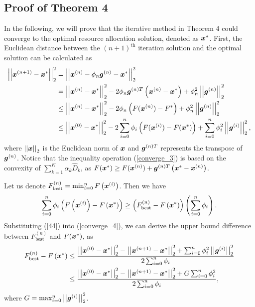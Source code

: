 \documentclass[journal,draftcls,onecolumn,12pt,twoside]{IEEEtran}
\newcommand{\bm}[1]{\mbox{\boldmath{$#1$}}}
\begin{document}
\begin{appendices}
\section{Proof of Theorem 4}
In the following, we will prove that the iterative method in Theorem 4 could converge to the optimal resource allocation solution, denoted as ${\bm{x}}^*$. First, the Euclidean distance between the $(n+1)^{\text{th}}$ iteration solution and the optimal solution can be calculated as
\begin{align}
    \left|\left|{\bm{x}}^{(n+1)}-{\bm{x}}^*\right|\right|_2^2
        &= \left|\left|{\bm{x}}^{(n)}-\phi_n{\bm{g}}^{(n)}-{\bm{x}}^*\right|\right|_2^2  \label{converge_1}\\
        &= \left|\left|{\bm{x}}^{(n)}-{\bm{x}}^*\right|\right|_2^2-2\phi_n{\bm{g}}^{(n)T}\left({\bm{x}}^{(n)}-{\bm{x}}^*\right)+\phi_n^2\left|\left|{\bm{g}}^{(n)}\right|\right|_2^2  \label{converge_2}\\
        &\le\left|\left|{\bm{x}}^{(n)}-{\bm{x}}^*\right|\right|_2^2-2\phi_n\left(F({\bm{x}}^{(n)})-F^*\right)+\phi_n^2\left|\left|{\bm{g}}^{(n)}\right|\right|_2^2 \label{converge_3}\\
        &\le\left|\left|{\bm{x}}^{(0)}-{\bm{x}}^*\right|\right|_2^2-2\sum_{i=0}^{n}\phi_i\left(F({\bm{x}}^{(i)})-F({\bm{x}}^*)\right)+\sum_{i=0}^{n}\phi_i^2\left|\left|{\bm{g}}^{(i)}\right|\right|_2^2, \label{converge_4}
\end{align}
where $\left|\left|{\bm{x}}\right|\right|_2$ is the Euclidean norm of ${\bm{x}}$ and $\bm{g}^{(n)T}$ represents the transpose of $\bm{g}^{(n)}$. Notice that the  inequality operation (\ref{converge_3}) is based on the convexity of $\sum_{k=1}^{K}\alpha_k \widehat{D}_k$, as $F({\bm{x}}^*)\ge F({\bm{x}}^{(n)})+{\bm{g}}^{(n)T}\left({\bm{x}}^*-{\bm{x}}^{(n)}\right)$.

Let us denote $F^{(n)}_{\text{best}}=\min_{i=0}^n F\left({\bm{x}^{(i)}}\right)$. Then we have
\begin{equation}
    \sum_{i=0}^{n}\phi_i\left(F\left({\bm{x}}^{(i)}\right)-F\left({\bm{x}}^*\right)\right)\ge \left(F^{(n)}_{\text{best}}-F\left({\bm{x}}^*\right)\right)\left(\sum_{i=0}^{n}\phi_i\right).\label{44}
\end{equation}
Substituting (\ref{44}) into (\ref{converge_4}), we can derive the upper bound difference between $F^{(n)}_{\text{best}}$ and $F(\bm{x}^*)$, as
\begin{align}
    F^{(n)}_{\text{best}}-F\left(\bm{x}^*\right)
    & \le \frac{\left|\left|{\bm{x}}^{(0)}-{\bm{x}}^*\right|\right|_2^2-\left|\left|{\bm{x}}^{(n+1)}-{\bm{x}}^*\right|\right|_2^2 + \sum_{i=0}^{n}\phi_i^2\left|\left|{\bm{g}}^{(i)}\right|\right|_2^2}
          {2\sum_{i=0}^{n}\phi_i}  \label{45}\\
    & \le \frac{\left|\left|{\bm{x}}^{(0)}-{\bm{x}}^*\right|\right|_2^2-\left|\left|{\bm{x}}^{(n+1)}-{\bm{x}}^*\right|\right|_2^2+G\sum_{i=0}^{n}\phi_i^2}{2\sum_{i=0}^{n}\phi_i},\label{46}
\end{align}
where $G=\max_{i=0}^n \left|\left|{\bm{g}}^{(i)}\right|\right|_2^2$.


\end{appendices}
\end{document}
